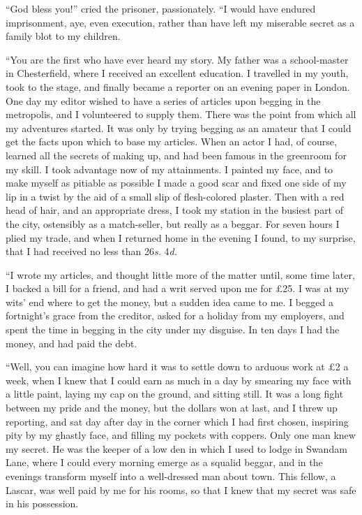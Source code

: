 “God bless you!” cried the prisoner, passionately. “I
would have endured imprisonment, aye, even execution, rather
than have left my miserable secret as a family blot to my
children.

“You are the first who have ever heard my story. My
father was a school-master in Chesterfield, where I received
an excellent education. I travelled in my youth, took to the
stage, and finally became a reporter on an evening paper in
London. One day my editor wished to have a series of articles
upon begging in the metropolis, and I volunteered to
supply them. There was the point from which all my adventures
started. It was only by trying begging as an amateur
that I could get the facts upon which to base my articles.
When an actor I had, of course, learned all the secrets of
making up, and had been famous in the greenroom for my
skill. I took advantage now of my attainments. I painted
my face, and to make myself as pitiable as possible I made a
good scar and fixed one side of my lip in a twist by the aid of
a small slip of flesh-colored plaster. Then with a red head of
hair, and an appropriate dress, I took my station in the busiest
part of the city, ostensibly as a match-seller, but really as
a beggar. For seven hours I plied my trade, and when I returned
home in the evening I found, to my surprise, that I
had received no less than 26\textit{s.} 4\textit{d.}

“I wrote my articles, and thought little more of the matter
until, some time later, I backed a bill for a friend, and had a
writ served upon me for £25. I was at my wits’ end where
to get the money, but a sudden idea came to me. I begged a
fortnight’s grace from the creditor, asked for a holiday from
my employers, and spent the time in begging in the city under
my disguise. In ten days I had the money, and had paid the
debt.

“Well, you can imagine how hard it was to settle down to
arduous work at £2 a week, when I knew that I could earn
as much in a day by smearing my face with a little paint, laying
my cap on the ground, and sitting still. It was a long
fight between my pride and the money, but the dollars won at
last, and I threw up reporting, and sat day after day in the
corner which I had first chosen, inspiring pity by my ghastly
face, and filling my pockets with coppers. Only one man
knew my secret. He was the keeper of a low den in which I
used to lodge in Swandam Lane, where I could every morning
emerge as a squalid beggar, and in the evenings transform
myself into a well-dressed man about town. This fellow, a
Lascar, was well paid by me for his rooms, so that I knew
that my secret was safe in his possession.

